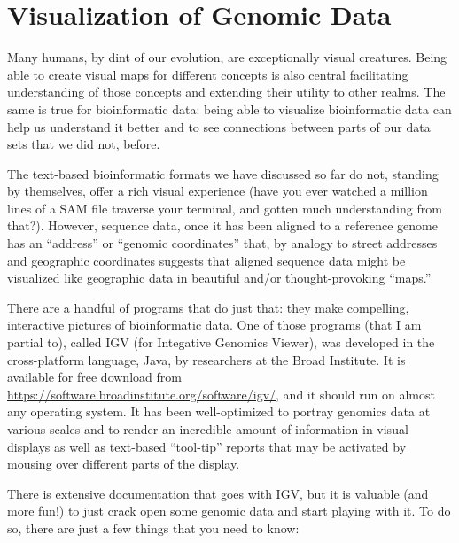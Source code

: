 \documentclass[]{krantz}
\begin{document}
\hypertarget{visualization-of-genomic-data}{%
\section{Visualization of Genomic Data}\label{visualization-of-genomic-data}}

Many humans, by dint of our evolution, are exceptionally visual creatures.
Being able to create visual maps for different concepts is also central
facilitating understanding of those concepts and extending their utility
to other realms. The same is true for bioinformatic data: being able to
visualize bioinformatic data can help us understand it better and to see
connections between parts of our data sets that we did not, before.

The text-based bioinformatic formats we have discussed so far do not,
standing by themselves, offer a rich visual experience (have you ever watched
a million lines of a SAM file traverse your terminal, and gotten much
understanding from that?). However, sequence data, once it has been aligned
to a reference genome has an ``address'' or ``genomic coordinates'' that, by analogy
to street addresses and geographic coordinates suggests that aligned
sequence data might be visualized
like geographic data in beautiful and/or thought-provoking ``maps.''

There are a handful of programs that do just that: they make compelling, interactive pictures
of bioinformatic data. One of those programs (that I am partial to), called
IGV (for Integative Genomics Viewer), was
developed in the cross-platform language, Java, by researchers at the Broad Institute.
It is available for free download from
\url{https://software.broadinstitute.org/software/igv/}, and it should run on almost any operating system. It has been
well-optimized to portray genomics data at various scales and to render
an incredible amount of information in visual displays as well as text-based
``tool-tip'' reports that may be activated by mousing over different parts of the display.

There is extensive documentation that goes with IGV, but it is valuable
(and more fun!) to just crack open some genomic data and start playing with
it. To do so, there are just a few things that you need to know:
\end{document}
